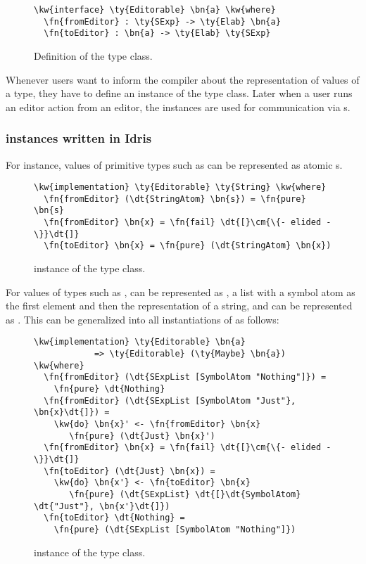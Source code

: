 \begin{figure}[H]
\begin{Verbatim}
\kw{interface} \ty{Editorable} \bn{a} \kw{where}
  \fn{fromEditor} : \ty{SExp} -> \ty{Elab} \bn{a}
  \fn{toEditor} : \bn{a} -> \ty{Elab} \ty{SExp}
\end{Verbatim}
\caption{Definition of the \Editorable{} type class.}
\label{code:editorable}
\end{figure}

Whenever users want to inform the compiler about the \sexp{}
representation of values of a type, they have to define an instance of the
\Editorable{} type class. Later when a user runs an editor action from an
editor, the \Editorable{} instances are used for communication via
\sexp{}s.

\subsubsection{\Editorable{} instances written in Idris}

For instance, values of primitive types such as  can be represented
as atomic \sexp{}s.

\begin{figure}[H]
\begin{Verbatim}
\kw{implementation} \ty{Editorable} \ty{String} \kw{where}
  \fn{fromEditor} (\dt{StringAtom} \bn{s}) = \fn{pure} \bn{s}
  \fn{fromEditor} \bn{x} = \fn{fail} \dt{[}\cm{\{- elided -\}}\dt{]}
  \fn{toEditor} \bn{x} = \fn{pure} (\dt{StringAtom} \bn{x})
\end{Verbatim}
\caption{ instance of the  type class.}
\label{code:editorableString}
\end{figure}

For values of types such as \mbox{},
 can be represented as , a list
\sexp{} with a symbol atom as the first element and then the \sexp{}
representation of a string, and  can be represented as
. This can be generalized into all instantiations of
 as follows:

\begin{figure}[H]
\begin{Verbatim}
\kw{implementation} \ty{Editorable} \bn{a}
            => \ty{Editorable} (\ty{Maybe} \bn{a}) \kw{where}
  \fn{fromEditor} (\dt{SExpList [SymbolAtom "Nothing"]}) =
    \fn{pure} \dt{Nothing}
  \fn{fromEditor} (\dt{SExpList [SymbolAtom "Just"}, \bn{x}\dt{]}) =
    \kw{do} \bn{x}' <- \fn{fromEditor} \bn{x}
       \fn{pure} (\dt{Just} \bn{x}')
  \fn{fromEditor} \bn{x} = \fn{fail} \dt{[}\cm{\{- elided -\}}\dt{]}
  \fn{toEditor} (\dt{Just} \bn{x}) =
    \kw{do} \bn{x'} <- \fn{toEditor} \bn{x}
       \fn{pure} (\dt{SExpList} \dt{[}\dt{SymbolAtom} \dt{"Just"}, \bn{x'}\dt{]})
  \fn{toEditor} \dt{Nothing} =
    \fn{pure} (\dt{SExpList [SymbolAtom "Nothing"]})
\end{Verbatim}
\label{code:editorableMaybe}
\caption{ instance of the  type class.}
\end{figure}

